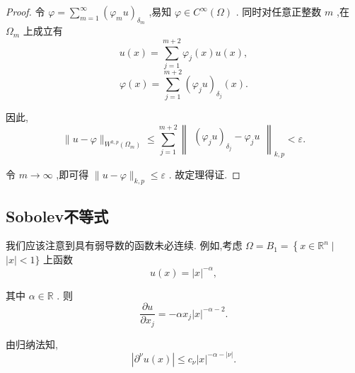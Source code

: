 \documentclass[lang=cn,newtx,10pt,scheme=chinese,thmcnt=chapter]{elegantbook}
\begin{document}
\begin{proof}
令 \(\varphi  = \mathop{\sum }\limits_{{m = 1}}^{\infty }{\left( {\varphi }_{m}u\right) }_{{\delta }_{m}}\) ,易知 \(\varphi  \in  {C}^{\infty }\left( \Omega \right)\) . 同时对任意正整数 \(m\) ,在 \({\Omega }_{m}\) 上成立有
\begin{equation*}
u\left( x\right)  = \mathop{\sum }\limits_{{j = 1}}^{{m + 2}}{\varphi }_{j}\left( x\right) u\left( x\right) ,
\end{equation*}
\begin{equation*}
\varphi \left( x\right)  = \mathop{\sum }\limits_{{j = 1}}^{{m + 2}}{\left( {\varphi }_{j}u\right) }_{{\delta }_{j}}\left( x\right) .
\end{equation*}

因此,
\begin{equation*}
\parallel u - \varphi {\parallel }_{{W}^{k,p}\left( {\Omega }_{m}\right) } \leqslant  \mathop{\sum }\limits_{{j = 1}}^{{m + 2}}{\begin{Vmatrix}{\left( {\varphi }_{j}u\right) }_{{\delta }_{j}} - {\varphi }_{j}u\end{Vmatrix}}_{k,p} < \varepsilon .
\end{equation*}

令 \(m \rightarrow  \infty\) ,即可得 \(\parallel u - \varphi {\parallel }_{k,p} \leqslant  \varepsilon\) . 故定理得证.

\end{proof}

\subsection{Sobolev不等式}

我们应该注意到具有弱导数的函数未必连续. 例如,考虑 \(\Omega  = {B}_{1} = \left\{  {x \in  {\mathbb{R}}^{n} \mid  }\right.\)  \(\left| x\right|  < 1\}\) 上函数
\begin{equation*}
u\left( x\right)  = {\left| x\right| }^{-\alpha },
\end{equation*}

其中 \(\alpha  \in  \mathbb{R}\) . 则
\begin{equation*}
\frac{\partial u}{\partial {x}_{j}} =  - \alpha {x}_{j}{\left| x\right| }^{-\alpha  - 2}.
\end{equation*}

由归纳法知,
\begin{equation*}
\left| {{\partial }^{\nu }u\left( x\right) }\right|  \leqslant  {c}_{\nu }{\left| x\right| }^{-\alpha  - \left| \nu \right| }.
\end{equation*}
\end{document}
